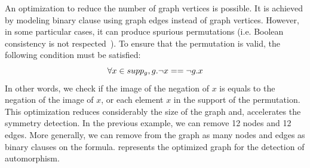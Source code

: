 %
%
%
An optimization to reduce the number of graph vertices is possible. It is achieved by modeling binary clause
using graph edges instead of graph vertices.  However, in some particular cases, it can produce
spurious permutations (i.e. Boolean consistency is not respected~\cite{aloul2003solving}).
To ensure that the permutation is valid, the following condition must be satisfied:
$$\forall x \in supp_g, g.\neg x == \neg g.x$$
In other words, we check if the image of the negation of $x$ is equals to the negation of the image of $x$,
or each element $x$ in the support of the permutation.
This optimization reduces considerably the size of the 
graph and, accelerates the symmetry detection.
In the previous example, we can remove 12 nodes and 12 edges. More generally,
we can remove from the graph as many nodes and edges as binary clauses on the formula.
 represents the optimized graph for the detection of automorphism.
